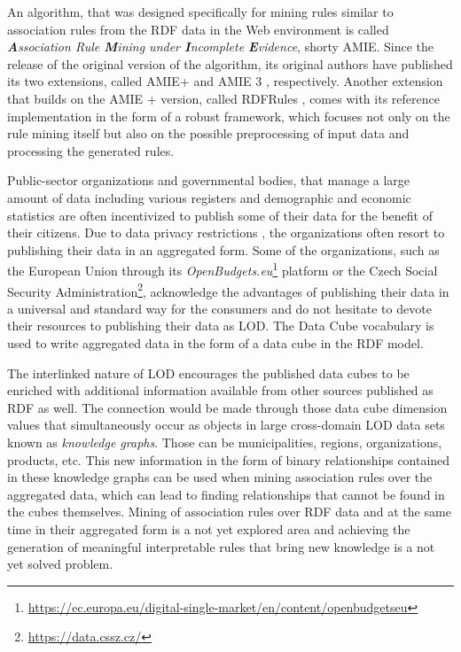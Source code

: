 An algorithm, that was designed specifically for mining rules similar to association rules from the RDF data in the Web environment is called \textit{\textbf{A}ssociation Rule \textbf{M}ining under \textbf{I}ncomplete \textbf{E}vidence}, shorty AMIE. \cite{Galarraga2013} Since the release of the original version of the algorithm, its original authors have published its two extensions, called AMIE+ \cite{Galarraga2015} and AMIE 3 \cite{Galarraga2020}, respectively. Another extension that builds on the AMIE + version, called RDFRules \cite{Zeman2020}, comes with its reference implementation in the form of a robust framework, which focuses not only on the rule mining itself but also on the possible preprocessing of input data and processing the generated rules.

Public-sector organizations and governmental bodies, that manage a large amount of data including various registers and demographic and economic statistics are often incentivized to publish some of their data for the benefit of their citizens. Due to data privacy restrictions \cite{gdpr162_2020}, the organizations often resort to publishing their data in an aggregated form. Some of the organizations, such as the European Union through its \textit{OpenBudgets.eu}\footnote{\href{https://ec.europa.eu/digital-single-market/en/content/openbudgetseu}{https://ec.europa.eu/digital-single-market/en/content/openbudgetseu}} platform or the Czech Social Security Administration\footnote{\href{https://data.cssz.cz/}{https://data.cssz.cz/}}, acknowledge the advantages of publishing their data in a universal and standard way for the consumers and do not hesitate to devote their resources to publishing their data as LOD. The Data Cube vocabulary \cite{dcv2014} is used to write aggregated data in the form of a data cube in the RDF model.

The interlinked nature of LOD encourages the published data cubes to be enriched with additional information available from other sources published as RDF as well. The connection would be made through those data cube dimension values that simultaneously occur as objects in large cross-domain LOD data sets known as \textit{knowledge graphs}. Those can be municipalities, regions, organizations, products, etc. This new information in the form of binary relationships contained in these knowledge graphs can be used when mining association rules over the aggregated data, which can lead to finding relationships that cannot be found in the cubes themselves. Mining of association rules over RDF data and at the same time in their aggregated form is a not yet explored area and achieving the generation of meaningful interpretable rules that bring new knowledge is a not yet solved problem.

